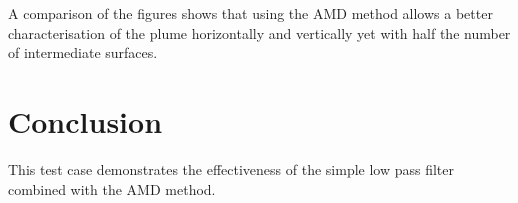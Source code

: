 
A comparison of the figures shows that using the AMD method allows a better
characterisation of the plume horizontally and vertically yet with half the
number of intermediate surfaces.

\section{Conclusion}
This test case demonstrates the effectiveness of the simple low pass filter
combined with the AMD method.
